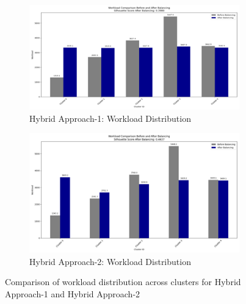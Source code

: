     \begin{figure}[ht]
        \centering
        \begin{subfigure}[b]{0.45\textwidth}
            \centering
            \includegraphics[width=\textwidth]{images/7.1.2 hybrid 1 workload.png}
            \caption{Hybrid Approach-1: Workload Distribution}
            \label{fig:hybrid1_workload}
        \end{subfigure}
        \hfill
        \begin{subfigure}[b]{0.45\textwidth}
            \centering
            \includegraphics[width=\textwidth]{images/7.1.2 hybrid 2 workload.png}
            \caption{Hybrid Approach-2: Workload Distribution}
            \label{fig:hybrid2_workload}
        \end{subfigure}
        \caption{Comparison of workload distribution across clusters for Hybrid Approach-1 and Hybrid Approach-2}
        \label{fig:hybrid_workload_comparison}
    \end{figure}

